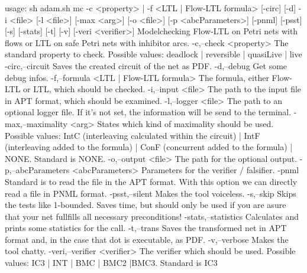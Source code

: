 usage: sh adam.sh mc -c <property> | -f <LTL | Flow-LTL formula> [-circ] [-d]  -i <file> [-l
       <file>] [-max <arg>] [-o <file>] [-p <abcParameters>] [-pnml] [-psst] [-s] [-stats]
       [-t] [-v] [-veri <verifier>]
Modelchecking Flow-LTL on Petri nets with flows or LTL on safe Petri nets with inhibitor arcs.
 -c,--check <property>                   The standard property to check. Possible values:
                                         deadlock | reversible | quasiLive | live
 -circ,--circuit                         Saves the created circuit of the net as PDF.
 -d,--debug                              Get some debug infos.
 -f,--formula <LTL | Flow-LTL formula>   The formula, either Flow-LTL or LTL, which should be
                                         checked.
 -i,--input <file>                       The path to the input file in APT format, which
                                         should be examined.
 -l,--logger <file>                      The path to an optional logger file. If it's not set,
                                         the information will be send to the terminal.
 -max,--maximality <arg>                 States which kind of maximality should be used.
                                         Possible values: IntC (interleaving calculated within
                                         the circuit)  | IntF (interleaving added to the
                                         formula)  | ConF (concurrent added to the formula)  |
                                         NONE. Standard is NONE.
 -o,--output <file>                      The path for the optional output.
 -p,--abcParameters <abcParameters>      Parameters for the verifier / falsifier.
 -pnml                                   Standard is to read the file in the APT format. With
                                         this option we can directly read a file in PNML
                                         format.
 -psst,--silent                          Makes the tool voiceless.
 -s,--skip                               Skips the tests like 1-bounded. Saves time, but
                                         should only be used if you are asure that your net
                                         fullfills  all necessary preconditions!
 -stats,--statistics                     Calculates and prints some statistics for the call.
 -t,--trans                              Saves the transformed net in APT format and, in the
                                         case that dot is executable, as PDF.
 -v,--verbose                            Makes the tool chatty.
 -veri,--verifier <verifier>             The verifier which should be used. Possible values:
                                         IC3 | INT | BMC | BMC2 |BMC3. Standard is IC3
